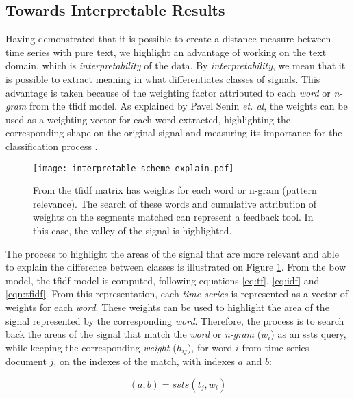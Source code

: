 \subsection{Towards Interpretable Results}

Having demonstrated that it is possible to create a distance measure between time series with pure text, we highlight an advantage of working on the text domain, which is \textit{interpretability} of the data. By \textit{interpretability}, we mean that it is possible to extract meaning in what differentiates classes of signals. This advantage is taken because of the weighting factor attributed to each \textit{word} or \textit{n-gram} from the \gls{tfidf} model. As explained by Pavel Senin \textit{et. al}, the weights can be used as a weighting vector for each word extracted, highlighting the corresponding shape on the original signal and measuring its importance for the classification process \cite{sax_vsm}.

\begin{figure}
    \centering
    \texttt{[image: interpretable\_scheme\_explain.pdf]}
    \caption{From the \gls{tfidf} matrix has weights for each word or n-gram (pattern relevance). The search of these words and cumulative attribution of weights on the segments matched can represent a feedback tool. In this case, the valley of the signal is highlighted.}
    \label{fig:interpretable_step}
\end{figure}


The process to highlight the areas of the signal that are more relevant and able to explain the difference between classes is illustrated on Figure \ref{fig:interpretable_step}. From the \gls{bow} model, the \gls{tfidf} model is computed, following equations \ref{eq:tf}, \ref{eq:idf} and \ref{eqn:tfidf}. From this representation, each \textit{time series} is represented as a vector of weights for each \textit{word}. These weights can be used to highlight the area of the signal represented by the corresponding \textit{word}. Therefore, the process is to search back the areas of the signal that match the \textit{word} or \textit{n-gram} ($w_i$) as an \gls{ssts} query, while keeping the corresponding \textit{weight} ($h_{ij}$), for word $i$ from time series document $j$, on the indexes of the match, with indexes $a$ and $b$:

\begin{equation}
(a,b) = ssts(t_j, w_i)
\end{equation}

